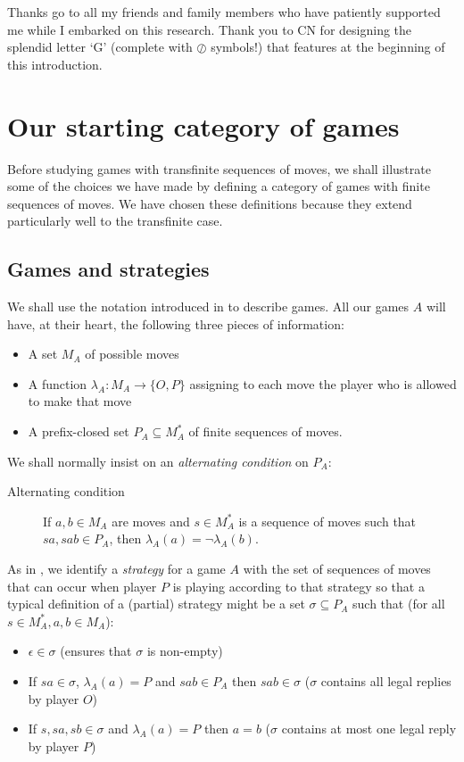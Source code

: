 \documentclass[11pt]{article} %
\theoremstyle{plain} %
\theoremstyle{definition} %
\theoremstyle{note}
\theoremstyle{exercisestyle}
\newcommand*\from{\colon}
\newcommand{\cmap}[3]{#1\from{}#2\to{}#3}
\newcommand{\sequoid}{\oslash}
\newcommand{\OP}{\{O,P\}}
\newcommand{\emptyplay}{\epsilon}
\renewcommand{\subset}{\subseteq}
\begin{document}
Thanks go to all my friends and family members who have patiently supported me while I embarked on this research.  Thank you to CN for designing the splendid letter `G' (complete with $\sequoid$ symbols!) that features at the beginning of this introduction.  

\section{Our starting category of games}

Before studying games with transfinite sequences of moves, we shall illustrate some of the choices we have made by defining a category of games with finite sequences of moves.  We have chosen these definitions because they extend particularly well to the transfinite case.  

\subsection{Games and strategies}

We shall use the notation introduced in \cite{abramskyjagadeesangames} to describe games.  All our games $A$ will have, at their heart, the following three pieces of information:
\begin{itemize}
  \item A set $M_A$ of possible moves
  \item A function $\cmap{\lambda_A}{M_A}{\OP}$ assigning to each move the player who is allowed to make that move
  \item A prefix-closed set $P_A\subset M_A^*$ of finite sequences of moves.
\end{itemize}
We shall normally insist on an \emph{alternating condition} on $P_A$:
\begin{description}
  \item[Alternating condition] If $a,b\in M_A$ are moves and $s\in M_A^*$ is a sequence of moves such that $sa, sab\in P_A$, then $\lambda_A(a)=\neg\lambda_A(b)$.
\end{description}

As in \cite{abramskyjagadeesangames}, we identify a \emph{strategy} for a game $A$ with the set of sequences of moves that can occur when player $P$ is playing according to that strategy so that a typical definition of a (partial) strategy might be a set $\sigma\subset P_A$ such that (for all $s\in M_A^*, a,b\in M_A$):
\begin{itemize}
  \item $\emptyplay\in\sigma$ (ensures that $\sigma$ is non-empty)
  \item If $sa\in\sigma$, $\lambda_A(a)=P$ and $sab\in P_A$ then $sab\in\sigma$ ($\sigma$ contains all legal replies by player $O$)
  \item If $s,sa,sb\in\sigma$ and $\lambda_A(a)=P$ then $a=b$ ($\sigma$ contains at most one legal reply by player $P$)
\end{itemize}
\end{document}
